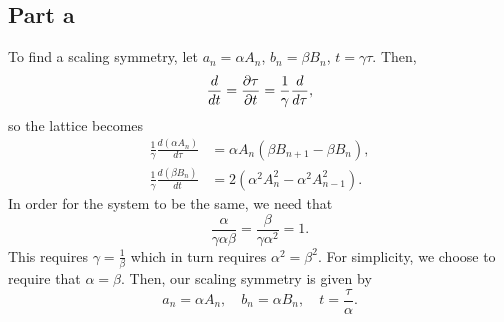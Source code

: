 \documentclass{article}
\begin{document}
\subsection{Part a}
To find a scaling symmetry, let $a_n=\alpha A_n$, $b_n=\beta B_n$, $t=\gamma \tau$. Then,
\[
\frac{d}{dt}=\frac{\partial \tau}{\partial t}=\frac{1}{\gamma}\frac{d}{d\tau},
\]
so the lattice becomes
\begin{align*}
	\frac{1}{\gamma}\frac{d(\alpha A_n)}{d\tau}&=\alpha A_n(\beta B_{n+1}-\beta B_n),\\
	\frac{1}{\gamma}\frac{d(\beta B_n)}{dt}&=2(\alpha^2A_n^2-\alpha^2A_{n-1}^2).
\end{align*}
In order for the system to be the same, we need that 
\[
\frac{\alpha}{\gamma\alpha\beta}=\frac{\beta}{\gamma\alpha^2}=1.
\]
This requires $\gamma=\frac{1}{\beta}$ which in turn requires $\alpha^2=\beta^2$. For simplicity, we choose to require that $\alpha=\beta$. Then, our scaling symmetry is given by
\[
a_n=\alpha A_n,\quad b_n=\alpha B_n,\quad t=\frac{\tau}{\alpha}.
\]
\end{document}
